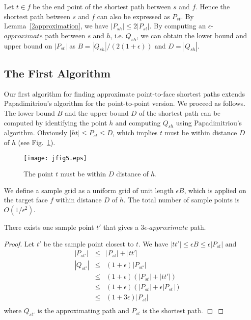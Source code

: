 \documentclass{llncs}
\begin{document}
Let $t\in f$ be the end point of the shortest path between $s$ and $f$. Hence the shortest path between $s$ and $f$ can also be expressed as $P_{st}$. By Lemma~\ref{2approximation}, we have $|P_{sh}|\le 2 |P_{st}|$. By computing an $\epsilon$-$approximate$ path between $s$ and $h$, i.e. $Q_{sh}$, we can obtain the lower bound and upper bound on $|P_{st}|$ as $B=|Q_{sh}|/(2(1+\epsilon))$ and $D=|Q_{sh}|$.

\subsection{The First Algorithm}
Our first algorithm for finding approximate point-to-face shortest paths extends Papadimitriou's algorithm for the point-to-point version. We proceed as follows.
The lower bound $B$ and the upper bound $D$ of the shortest path can be computed by identifying the
point $h$ and computing $Q_{sh}$ using Papadimitriou's algorithm.
Obviously $|ht|\leq P_{st}\leq D$, which implies $t$ must be within distance $D$ of $h$ (see Fig.~\ref{jfig5}).

\begin{figure}\begin{center}
    \leavevmode
\texttt{[image: jfig5.eps]}
    \caption{The point $t$ must be within $D$ distance of $h$.}
    \label{jfig5}
    \end{center}
\end{figure}

We define a sample grid as a
uniform grid of unit length $\epsilon B$, which is applied on the target face $f$ within distance $D$ of $h$. The total number
of sample points is $O(1/\epsilon^2)$.

\begin{lemma}
\label{sample}
There exists one sample point $t'$ that gives a $3\epsilon$-$approximate$ path.
\end{lemma}

\noindent \begin{proof}
Let $t'$ be the sample point closest to $t$. We have $|tt'| \le \epsilon B \le \epsilon |P_{st}|$ and
\begin{eqnarray*}
|P_{st'}| &\le& |P_{st}| + |tt'|\\
|Q_{st'}| &\le& (1+\epsilon)|P_{st'}| \\
        &\le& (1+\epsilon)(|P_{st}| + |tt'|)\\
        &\le& (1+\epsilon)(|P_{st}| +\epsilon |P_{st}|)\\
        &\le& (1+3\epsilon)|P_{st}|\\
\end{eqnarray*}
where $Q_{st'}$ is the approximating path and $P_{st}$ is the shortest path.
\hfill $\Box$
\end{proof}
\end{document}
